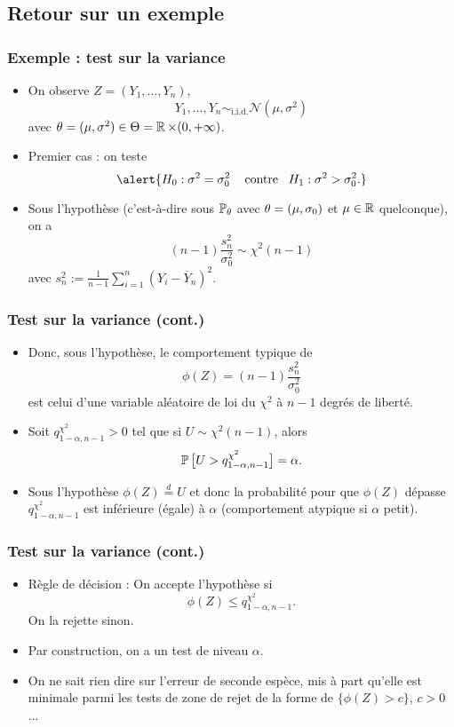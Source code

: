\subsection{Retour sur un exemple}
\begin{frame}
\frametitle{Exemple : test sur la variance}
\begin{itemize}
\item On observe $Z=(Y_1,\ldots, Y_n)$,
$$Y_1,\ldots, Y_n \sim_{\text{i.i.d.}}{\mathcal N}(\mu,\sigma^2)$$
avec $\theta =(\mu,\sigma^2) \in \Theta = \operatorname{{\mathbb R}} \times (0,+\infty)$.
\item \alert{Premier cas} : on teste
$$ \alert{ H_0:\sigma^2 = \sigma_0^2\;\;\;\text{ contre}\;\;\; H_1:\sigma^2 > \sigma_0^2.}$$
\item Sous l'hypothèse (c'est-à-dire sous $\operatorname{{\mathbb P}}_\theta$ avec $\theta = (\mu,\sigma_0)$ et $\mu \in \operatorname{{\mathbb R}}$ quelconque), on a
$$\boxed{(n-1)\frac{s_n^2}{\sigma_0^2} \sim \chi^2(n-1)}$$
avec $s_n^2:=\frac{1}{n-1}\sum_{i = 1}^n (Y_i-\overline{Y}_n)^2$.
\end{itemize}
\end{frame}

\begin{frame}
\frametitle{Test sur la variance (cont.)}
\begin{itemize}
\item Donc, \alert{sous l'hypothèse}, le comportement  typique de
$$\phi(Z) = (n-1)\frac{s_n^2}{\sigma_0^2} $$
est celui d'une variable aléatoire de loi du $\chi^2$ à $n-1$ degrés de liberté.
\item Soit $q_{1-\alpha,n-1}^{\chi^2}>0$ tel que si $U \sim {\chi^2}(n-1)$, alors
$$\operatorname{{\mathbb P}}\big[U > q_{1-\alpha,n-1}^{\chi^2}\big] = \alpha.$$
\item \alert{Sous l'hypothèse} $\phi(Z)\stackrel{d}{=} U$ et donc la probabilité pour que $\phi(Z)$ dépasse $q_{1-\alpha,n-1}^{\chi^2}$ est inférieure (égale) à $\alpha$ (comportement atypique si $\alpha$ petit).
\end{itemize}
\end{frame}

\begin{frame}
\frametitle{Test sur la variance (cont.)}
\begin{itemize}
\item \alert{Règle de décision :} On accepte l'hypothèse si
$$\phi(Z) \leq  q_{1-\alpha,n-1}^{\chi^2}.$$
On la rejette sinon.
\item Par construction, on a un \alert{test de niveau $\alpha$}.
\item On ne \alert{sait rien dire sur l'erreur de seconde espèce}, mis à part qu'elle est minimale parmi les tests de zone de rejet de la forme de $\{\phi(Z) > c\}$, $c>0$...
\end{itemize}
\end{frame}

